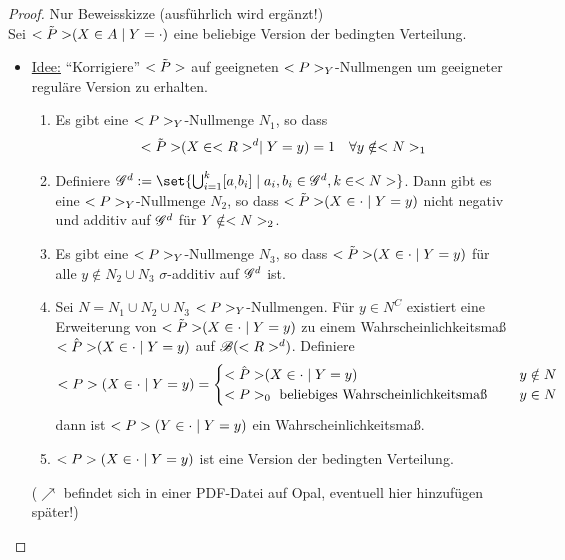 \begin{proof}
	Nur Beweisskizze (ausführlich wird ergänzt!)\\
	Sei $\tilde{\P}(X \in A \mid Y = \cdot)$ eine beliebige Version der bedingten Verteilung.
	\begin{itemize}
		\item \ul{Idee:} ``Korrigiere'' $\tilde{\P}$ auf geeigneten $\P_Y$-Nullmengen um geeigneter reguläre Version zu erhalten.
		\begin{enumerate}
			\item Es gibt eine $\P_Y$-Nullmenge $N_1$, so dass
			\begin{align*}
				\tilde{\P}(X \in \Rd \mid Y = y) = 1 \quad \forall y \notin \N_1
			\end{align*}
			\item Definiere $\G^d := \set{\bigcup_{i = 1}^k [a_, b_i] \mid a_i, b_i \in \G^d, k \in \N}$. Dann gibt es eine $\P_Y$-Nullmenge $N_2$, so dass $\tilde{\P}(X \in \cdot \mid Y = y)$ nicht negativ und additiv auf $\G^d$ für $Y \notin \N_2$.
			\item Es gibt eine $\P_Y$-Nullmenge $N_3$, so dass $\tilde{\P}(X \in \cdot \mid Y = y)$ für alle $y \notin N_2 \cup N_3$ $\sigma$-additiv auf $\G^d$ ist.
			\item Sei $N = N_1 \cup N_2 \cup N_3$ $\P_Y$-Nullmengen. Für $y \in N^C$ existiert eine Erweiterung von $\tilde{\P}(X \in \cdot \mid Y = y)$ zu einem Wahrscheinlichkeitsmaß $\hat{\P}(X \in \cdot \mid Y = y)$ auf $\borel(\Rd)$. Definiere
			\begin{align*}
				\P(X \in \cdot \mid Y = y) = \begin{cases}
				\hat{\P}(X \in \cdot \mid Y = y) & \quad y \notin N\\
				\P_0 \text{ beliebiges Wahrscheinlichkeitsmaß } & \quad y \in N
				\end{cases}
			\end{align*} 
			dann ist $\P(Y \in \cdot \mid Y = y)$ ein Wahrscheinlichkeitsmaß.
			\item $\P(X \in \cdot \mid Y = y)$ ist eine Version der bedingten Verteilung.
		\end{enumerate}
	($\nearrow$ befindet sich in einer PDF-Datei auf Opal, eventuell hier hinzufügen später!) %
	\end{itemize}
\end{proof}
